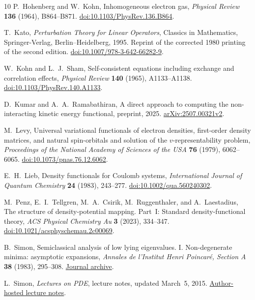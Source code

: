 \begin{thebibliography}{10}
P.~Hohenberg and W.~Kohn,
Inhomogeneous electron gas,
\emph{Physical Review} \textbf{136} (1964), B864--B871.
\href{https://doi.org/10.1103/PhysRev.136.B864}{doi:10.1103/PhysRev.136.B864}.

T.~Kato,
\emph{Perturbation Theory for Linear Operators},
Classics in Mathematics,
Springer-Verlag, Berlin--Heidelberg, 1995.
Reprint of the corrected 1980 printing of the second edition.
\href{https://doi.org/10.1007/978-3-642-66282-9}{doi:10.1007/978-3-642-66282-9}.

W.~Kohn and L.~J.~Sham,
Self-consistent equations including exchange and correlation effects,
\emph{Physical Review} \textbf{140} (1965), A1133--A1138.
\href{https://doi.org/10.1103/PhysRev.140.A1133}{doi:10.1103/PhysRev.140.A1133}.

D.~Kumar and A.~A.~Ramabathiran,
A direct approach to computing the non-interacting kinetic energy functional,
preprint, 2025.
\href{https://arxiv.org/abs/2507.00321v2}{arXiv:2507.00321v2}.

M.~Levy,
Universal variational functionals of electron densities, first-order
density matrices, and natural spin-orbitals and solution of the
\(v\)-representability problem,
\emph{Proceedings of the National Academy of Sciences of the USA}
\textbf{76} (1979), 6062--6065.
\href{https://doi.org/10.1073/pnas.76.12.6062}{doi:10.1073/pnas.76.12.6062}.

E.~H.~Lieb,
Density functionals for Coulomb systems,
\emph{International Journal of Quantum Chemistry}
\textbf{24} (1983), 243--277.
\href{https://doi.org/10.1002/qua.560240302}{doi:10.1002/qua.560240302}.

M.~Penz, E.~I.~Tellgren, M.~A.~Csirik, M.~Ruggenthaler,
and A.~Laestadius,
The structure of density-potential mapping.
Part~I: Standard density-functional theory,
\emph{ACS Physical Chemistry Au} \textbf{3} (2023), 334--347.
\href{https://doi.org/10.1021/acsphyschemau.2c00069}{doi:10.1021/acsphyschemau.2c00069}.

B.~Simon,
Semiclassical analysis of low lying eigenvalues.
I. Non-degenerate minima: asymptotic expansions,
\emph{Annales de l'Institut Henri Poincar\'e, Section A}
\textbf{38} (1983), 295--308.
\href{https://www.numdam.org/item/AIHPA_1983__38_3_295_0/}{Journal archive}.

L.~Simon,
\emph{Lectures on PDE},
lecture notes, updated March~5, 2015.
\href{https://math.stanford.edu/~lms/lecs-on-pde.pdf}{Author-hosted lecture notes}.


\end{thebibliography}
